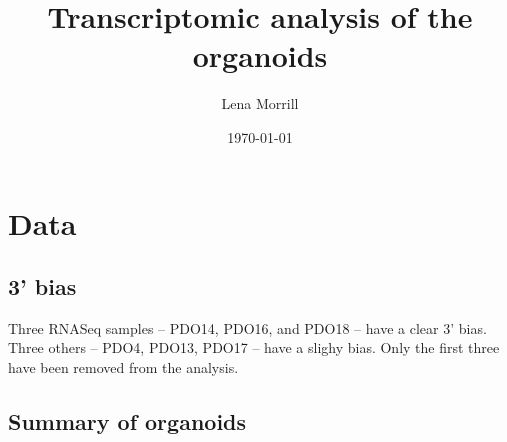 \documentclass{article}
\author{Lena Morrill}
\date{\today}
\title{Transcriptomic analysis of the organoids}
\begin{document}
\maketitle

\tableofcontents

\section{Data}
\subsection{3' bias}

Three RNASeq samples -- PDO14, PDO16, and PDO18 -- have a clear 3' bias. Three others -- PDO4, PDO13, PDO17 -- have a slighy bias. Only the first three have been removed from the analysis.

\subsection{Summary of organoids}

\end{document}
